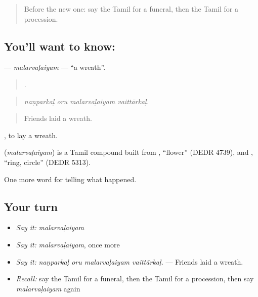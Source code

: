 \label{lesson:TA-C323-malarvalaiyam}



\begin{quote}
Before the new one: say the Tamil for a funeral, then the Tamil for a procession.
\end{quote}

\subsection*{You'll want to know: }
\textbf{} — \emph{malarvaḷaiyam} — \textquotedblleft{}a wreath\textquotedblright{}.

\begin{quote}
   .
\end{quote}

\begin{quote}
\emph{naṇparkaḷ oru malarvaḷaiyam vaittārkaḷ.}
\end{quote}

\begin{quote}
Friends laid a wreath.
\end{quote}

 , to lay a wreath.

\begin{cousinweb}
\textbf{} (\emph{malarvaḷaiyam}) is a Tamil compound built from , \textquotedblleft{}flower\textquotedblright{} (DEDR 4739), and , \textquotedblleft{}ring, circle\textquotedblright{} (DEDR 5313).
\end{cousinweb}

\begin{grammarlens}[title={What you've built}]
One more word for telling what happened.
\end{grammarlens}

\subsection*{Your turn}
\begin{itemize}
\raggedright
  \item \emph{Say it:} \emph{malarvaḷaiyam}
  \item \emph{Say it:} \emph{malarvaḷaiyam}, once more
  \item \emph{Say it:} \emph{naṇparkaḷ oru malarvaḷaiyam vaittārkaḷ.} — Friends laid a wreath.
  \item \emph{Recall:} say the Tamil for a funeral, then the Tamil for a procession, then say \emph{malarvaḷaiyam} again
\end{itemize}


